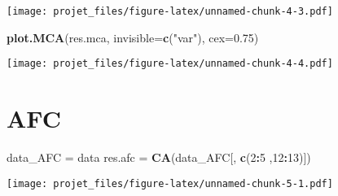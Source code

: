 \documentclass[
]{article}
\newenvironment{Shaded}{\begin{snugshade}}{\end{snugshade}}
\newcommand{\DataTypeTok}[1]{\textcolor[rgb]{0.13,0.29,0.53}{#1}}
\newcommand{\DecValTok}[1]{\textcolor[rgb]{0.00,0.00,0.81}{#1}}
\newcommand{\FloatTok}[1]{\textcolor[rgb]{0.00,0.00,0.81}{#1}}
\newcommand{\KeywordTok}[1]{\textcolor[rgb]{0.13,0.29,0.53}{\textbf{#1}}}
\newcommand{\NormalTok}[1]{#1}
\newcommand{\OperatorTok}[1]{\textcolor[rgb]{0.81,0.36,0.00}{\textbf{#1}}}
\newcommand{\StringTok}[1]{\textcolor[rgb]{0.31,0.60,0.02}{#1}}
\begin{document}
\texttt{[image: projet\_files/figure-latex/unnamed-chunk-4-3.pdf]}

\begin{Shaded}
\begin{Highlighting}[]
\KeywordTok{plot.MCA}\NormalTok{(res.mca, }\DataTypeTok{invisible=}\KeywordTok{c}\NormalTok{(}\StringTok{"var"}\NormalTok{), }\DataTypeTok{cex=}\FloatTok{0.75}\NormalTok{)}
\end{Highlighting}
\end{Shaded}

\texttt{[image: projet\_files/figure-latex/unnamed-chunk-4-4.pdf]}

\hypertarget{afc}{%
\section{AFC}\label{afc}}

\begin{Shaded}
\begin{Highlighting}[]
\NormalTok{data_AFC =}\StringTok{ }\NormalTok{data}
\NormalTok{res.afc =}\StringTok{ }\KeywordTok{CA}\NormalTok{(data_AFC[, }\KeywordTok{c}\NormalTok{(}\DecValTok{2}\OperatorTok{:}\DecValTok{5}\NormalTok{ ,}\DecValTok{12}\OperatorTok{:}\DecValTok{13}\NormalTok{)])}
\end{Highlighting}
\end{Shaded}

\texttt{[image: projet\_files/figure-latex/unnamed-chunk-5-1.pdf]}
\end{document}
